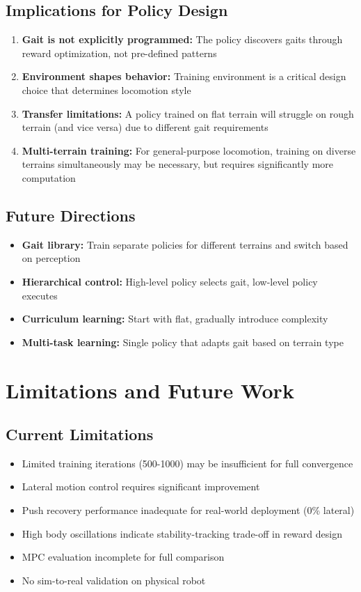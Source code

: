 \documentclass[12pt,a4paper]{article}
\begin{document}
\subsection{Implications for Policy Design}

\begin{enumerate}
    \item \textbf{Gait is not explicitly programmed:} The policy discovers gaits through reward optimization, not pre-defined patterns
    \item \textbf{Environment shapes behavior:} Training environment is a critical design choice that determines locomotion style
    \item \textbf{Transfer limitations:} A policy trained on flat terrain will struggle on rough terrain (and vice versa) due to different gait requirements
    \item \textbf{Multi-terrain training:} For general-purpose locomotion, training on diverse terrains simultaneously may be necessary, but requires significantly more computation
\end{enumerate}

\subsection{Future Directions}

\begin{itemize}
    \item \textbf{Gait library:} Train separate policies for different terrains and switch based on perception
    \item \textbf{Hierarchical control:} High-level policy selects gait, low-level policy executes
    \item \textbf{Curriculum learning:} Start with flat, gradually introduce complexity
    \item \textbf{Multi-task learning:} Single policy that adapts gait based on terrain type
\end{itemize}

\section{Limitations and Future Work}

\subsection{Current Limitations}
\begin{itemize}
    \item Limited training iterations (500-1000) may be insufficient for full convergence
    \item Lateral motion control requires significant improvement
    \item Push recovery performance inadequate for real-world deployment (0\% lateral)
    \item High body oscillations indicate stability-tracking trade-off in reward design
    \item MPC evaluation incomplete for full comparison
    \item No sim-to-real validation on physical robot
\end{itemize}
\end{document}
